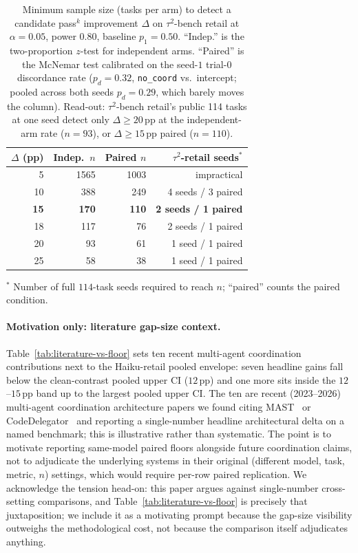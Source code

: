 \begin{table}[t]
\centering
\caption{Minimum sample size (tasks per arm) to detect a
candidate pass$^k$ improvement $\Delta$ on $\tau^2$-bench retail
at $\alpha{=}0.05$, power $0.80$, baseline $p_1{=}0.50$.
``Indep.'' is the two-proportion $z$-test for independent arms.
``Paired'' is the McNemar test calibrated on the seed-$1$
trial-0 discordance rate ($p_d{=}0.32$, \texttt{no\_coord} vs.\
intercept; pooled across both seeds $p_d{=}0.29$, which barely
moves the column).  Read-out: $\tau^2$-bench retail's public
114 tasks at one seed detect only $\Delta{\geq}20$\,pp at the
independent-arm rate ($n{=}93$), or $\Delta{\geq}15$\,pp
paired ($n{=}110$).}
\label{tab:mde}
\small
\begin{tabular}{rrrr}
\toprule
$\Delta$ (pp) & Indep.\ $n$ & Paired $n$ & $\tau^2$-retail seeds$^\ast$ \\
\midrule
5  & 1565 & 1003 & impractical \\
10 & 388  & 249  & 4 seeds / 3 paired \\
\textbf{15} & \textbf{170}  & \textbf{110}  & \textbf{2 seeds / 1 paired} \\
18 & 117  & 76   & 2 seeds / 1 paired \\
20 & 93   & 61   & 1 seed / 1 paired \\
25 & 58   & 38   & 1 seed / 1 paired \\
\bottomrule
\end{tabular}
\flushleft\footnotesize
$^\ast$ Number of full $114$-task seeds required to reach $n$;
``paired'' counts the paired condition.
\end{table}

\paragraph{Motivation only: literature gap-size context.}
Table~\ref{tab:literature-vs-floor} sets ten recent multi-agent
coordination contributions next to the Haiku-retail pooled
envelope: seven headline gains fall below the clean-contrast
pooled upper CI ($12$\,pp) and one more sits inside the
$12$--$15$\,pp band up to the largest pooled upper CI. The ten are recent (2023--2026) multi-agent
coordination architecture papers we found citing
MAST~\cite{mast2025} or CodeDelegator~\cite{codedelegator2026}
and reporting a single-number headline architectural delta on a
named benchmark; this is illustrative rather than systematic.
The point is to motivate reporting same-model paired floors
alongside future coordination claims, not to adjudicate the
underlying systems in their original (different model, task,
metric, $n$) settings, which would require per-row paired
replication. We acknowledge the tension head-on: this paper
argues against single-number cross-setting comparisons, and
Table~\ref{tab:literature-vs-floor} is precisely that
juxtaposition; we include it as a motivating prompt because
the gap-size visibility outweighs the methodological cost,
not because the comparison itself adjudicates anything.

